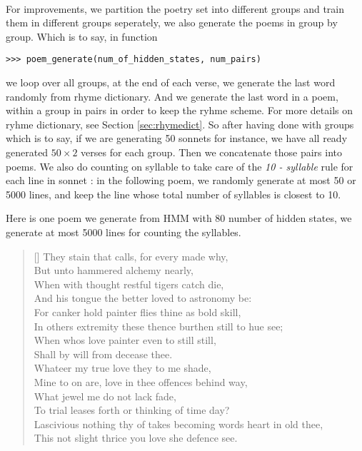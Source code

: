 \paragraph{}
For improvements, we partition the poetry set into different groups and train them in different groups seperately, we also generate the poems in group by group. Which is to say, in function
\begin{lstlisting}
>>> poem_generate(num_of_hidden_states, num_pairs)
\end{lstlisting}
we loop over all groups, at the end of each verse, we generate the last word randomly from rhyme dictionary. And we generate the last word in a poem, within a group in pairs in order to keep the ryhme scheme. For more details on ryhme dictionary, see Section \ref{sec:rhymedict}. So after having done with groups which is to say, if we are generating 50 sonnets for instance, we have all ready generated $50 \times 2$ verses for each group. Then we concatenate those pairs into poems. We also do counting on syllable to take care of the \textit{10 - syllable} rule for 
each line in sonnet : in the following poem, we randomly generate at most 50 or 5000 lines, and keep the line whose total number of syllables is closest to 10.

Here is one poem we generate from HMM with 80 number of hidden states, we generate at most 5000 lines for counting the syllables. 
\renewcommand{\poemtoc}{subsection}
\settowidth{\versewidth}{Thy proud hearts slave and vassal wretch to be?}
\begin{verse}[\versewidth]
They stain that calls, for every made why,\\
But unto hammered alchemy nearly,\\
When with thought restful tigers catch die,\\
And his tongue the better loved to astronomy be:\\
\vspace{5pt}
For canker hold painter flies thine as bold skill,\\
In others extremity these thence burthen still to hue see;\\
When whos love painter even to still still,\\
Shall by will from decease thee.\\
\vspace{5pt}
Whateer my true love they to me shade,\\
Mine to on are, love in thee offences behind way,\\
What jewel me do not lack fade,\\
To trial leases forth or thinking of time day?\\
\vspace{5pt}
\vin  Lascivious nothing thy of takes becoming words heart in old thee,\\
\vin  This not slight thrice you love she defence see.\\
\end{verse}
